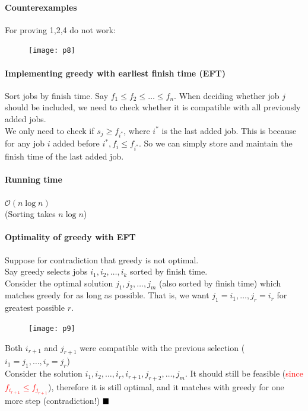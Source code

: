 \documentclass[11pt]{article}
\newcommand{\qed}[0]{$\hfill\blacksquare$}
\begin{document}
\paragraph{Counterexamples}
For proving 1,2,4 do not work:
\begin{figure}[h]
	\centering
	\texttt{[image: p8]}
\end{figure}

\paragraph{Implementing greedy with earliest finish time (EFT)}
Sort jobs by finish time. Say $f_1 \leq f_2 \leq \dots \leq f_n$. When deciding whether job $j$ should be included, we need to check whether it is compatible with all previously added jobs.\\
We only need to check if $s_j \geq f_{i^*}$, where $i^*$ is the last added job. This is because for any job $i$ added before $i^*, f_i \leq f_{i^*}$. So we can simply store and maintain the finish time of the last added job.
\paragraph{Running time}
$\mathcal{O}(n \log n)$ \\
(Sorting takes $n \log n$)

\paragraph{Optimality of greedy with EFT}
Suppose for contradiction that greedy is not optimal. \\
Say greedy selects jobs $i_1, i_2, \hdots, i_k$ sorted by finish time. \\
Consider the optimal solution $j_1, j_2, \hdots, j_m$ (also sorted by finish time) which matches greedy for as long as possible. That is, we want $j_1 = i_1, \hdots, j_r = i_r$ for greatest possible $r$.\\

\begin{figure}[h]
	\centering
	\texttt{[image: p9]}
\end{figure}

\noindent Both $i_{r+1}$ and $j_{r+1}$ were compatible with the previous selection ($i_1 = j_1, \hdots, i_r = j_r$)\\
Consider the solution $i_1, i_2, \hdots, i_r, i_{r+1}, j_{r+2}, \hdots, j_m$. It should still be feasible (\textcolor{red}{since $f_{i_{r+1}} \leq f_{j_{r+1}}$}), therefore it is still optimal, and it matches with greedy for one more step (contradiction!) \qed
\end{document}
